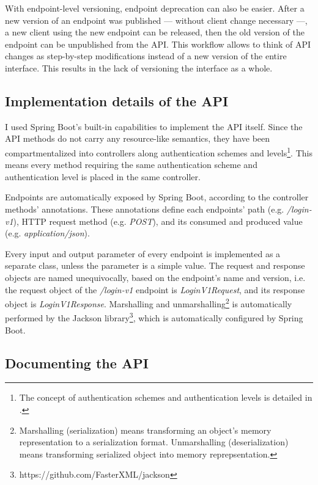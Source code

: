 With endpoint-level versioning, endpoint deprecation can also be easier. After a new version of an endpoint was published — without client change necessary —, a new client using the new endpoint can be released, then the old version of the endpoint can be unpublished from the API. This workflow allows to think of API changes as step-by-step modifications instead of a new version of the entire interface. This results in the lack of versioning the interface as a whole.

\subsection{Implementation details of the API}

I used Spring Boot's built-in capabilities to implement the API itself. Since the API methods do not carry any resource-like semantics, they have been compartmentalized into controllers along authentication schemes and levels\footnote{The concept of authentication schemes and authentication levels is detailed in .}. This means every method requiring the same authentication scheme and authentication level is placed in the same controller.

Endpoints are automatically exposed by Spring Boot, according to the controller methods' annotations. These annotations define each endpoints' path (e.g. \emph{/login-v1}), HTTP request method (e.g. \emph{POST}), and its consumed and produced value (e.g. \emph{application/json}).

Every input and output parameter of every endpoint is implemented as a separate class, unless the parameter is a simple value. The request and response objects are named unequivocally, based on the endpoint's name and version, i.e. the request object of the \emph{/login-v1} endpoint is \emph{LoginV1Request}, and its response object is \emph{LoginV1Response}. Marshalling and unmarshalling\footnote{Marshalling (serialization) means transforming an object's memory representation to a serialization format. Unmarshalling (deserialization) means transforming serialized object into memory reprepsentation.} is automatically performed by the Jackson library\footnote{https://github.com/FasterXML/jackson}, which is automatically configured by Spring Boot.

\subsection{Documenting the API}

